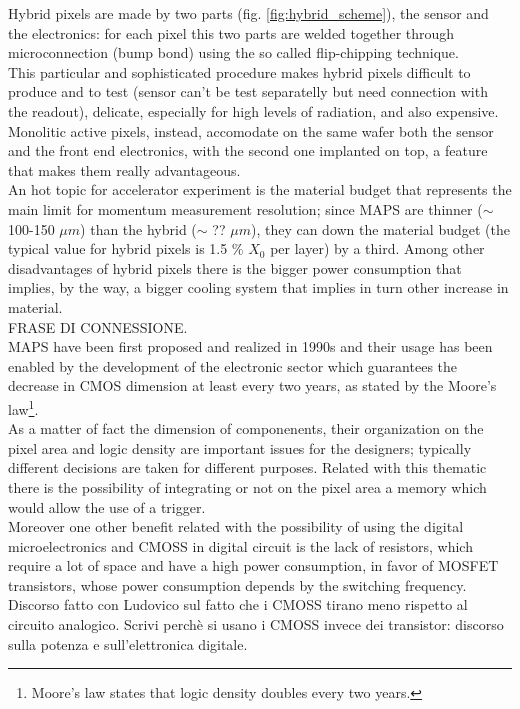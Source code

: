 Hybrid pixels are made by two parts (fig. \ref{fig:hybrid_scheme}), the sensor and the electronics: for each pixel this two parts are welded together through microconnection (bump bond) using the so called flip-chipping technique.\\
This particular and sophisticated procedure makes hybrid pixels difficult to produce and to test (sensor can't be test separatelly but need connection with the readout), delicate, especially for high levels of radiation, and also expensive. \\
Monolitic active pixels, instead, accomodate on the same wafer both the sensor and the front end electronics, with the second one implanted on top, a feature that makes them really advantageous. \\
An hot topic for accelerator experiment is the material budget that represents the main limit for momentum measurement resolution; since MAPS are thinner ($\sim$ 100-150 $\mu m$) than the hybrid ($\sim$ ?? $\mu m$),  they can down the material budget (the typical value for hybrid pixels is 1.5 \% $X_0$ per layer) by a third. Among other disadvantages of hybrid pixels there is the bigger power consumption that implies, by the way, a bigger cooling system that implies in turn other increase in material.\\
FRASE DI CONNESSIONE.\\

MAPS have been first proposed and realized in 1990s and their usage has been enabled by the development of the electronic sector which guarantees the decrease in CMOS dimension at least every two years, as stated by the Moore's law\footnote{Moore's law states that logic density doubles every two years.}.\\
As a matter of fact the dimension of componenents, their organization on the pixel area and logic density are important issues for the designers; typically different decisions are taken for different purposes. Related with this thematic there is the possibility of integrating or not on the pixel area a memory which would allow the use of a trigger. \\ 
Moreover one other benefit related with the possibility of using the digital microelectronics
and CMOSS in digital circuit is the lack of resistors, which require a lot of
space and have a high power consumption, in favor of MOSFET transistors, whose power
consumption depends by the switching frequency. Discorso fatto con Ludovico
sul fatto che i CMOSS tirano meno rispetto al circuito analogico.
Scrivi perchè si usano i CMOSS invece dei transistor: discorso sulla potenza e sull'elettronica digitale.\\

